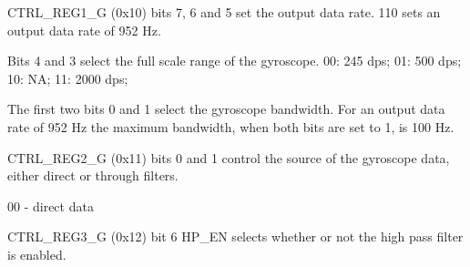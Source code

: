\documentclass[10pt, a4paper]{article}
\begin{document}
CTRL_REG1_G (0x10) bits 7, 6 and 5 set the output data rate. 110 sets an output data rate of 952 Hz.

Bits 4 and 3 select the full scale range of the gyroscope. 00: 245 dps; 01: 500 dps; 10: NA; 11: 2000 dps;

The first two bits 0 and 1 select the gyroscope bandwidth. For an output data rate of 952 Hz the maximum bandwidth, when both bits are set to 1, is 100 Hz.

CTRL_REG2_G (0x11) bits 0 and 1 control the source of the gyroscope data, either direct or through filters.

00 - direct data

CTRL_REG3_G (0x12) bit 6 HP_EN selects whether or not the high pass filter is enabled.
\end{document}
